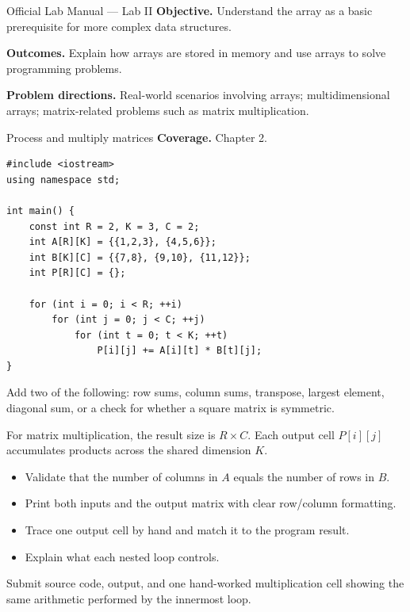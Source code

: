 
\begin{sourcealignment}{Official Lab Manual --- Lab II}
\textbf{Objective.} Understand the array as a basic prerequisite for more complex data structures.

\textbf{Outcomes.} Explain how arrays are stored in memory and use arrays to solve programming problems.

\textbf{Problem directions.} Real-world scenarios involving arrays; multidimensional arrays; matrix-related problems such as matrix multiplication.
\end{sourcealignment}

\begin{labproject}{Process and multiply matrices}
\textbf{Coverage.} Chapter 2.

\begin{lstlisting}
#include <iostream>
using namespace std;

int main() {
    const int R = 2, K = 3, C = 2;
    int A[R][K] = {{1,2,3}, {4,5,6}};
    int B[K][C] = {{7,8}, {9,10}, {11,12}};
    int P[R][C] = {};

    for (int i = 0; i < R; ++i)
        for (int j = 0; j < C; ++j)
            for (int t = 0; t < K; ++t)
                P[i][j] += A[i][t] * B[t][j];
}
\end{lstlisting}

\begin{tryit}
Add two of the following: row sums, column sums, transpose, largest element, diagonal sum, or a check for whether a square matrix is symmetric.
\end{tryit}

\begin{workedexample}
For matrix multiplication, the result size is $R\times C$. Each output cell $P[i][j]$ accumulates products across the shared dimension $K$.
\end{workedexample}
\end{labproject}

\begin{verification}
\begin{itemize}
  \item Validate that the number of columns in $A$ equals the number of rows in $B$.
  \item Print both inputs and the output matrix with clear row/column formatting.
  \item Trace one output cell by hand and match it to the program result.
  \item Explain what each nested loop controls.
\end{itemize}
\end{verification}

\begin{labdeliverable}
Submit source code, output, and one hand-worked multiplication cell showing the same arithmetic performed by the innermost loop.
\end{labdeliverable}
